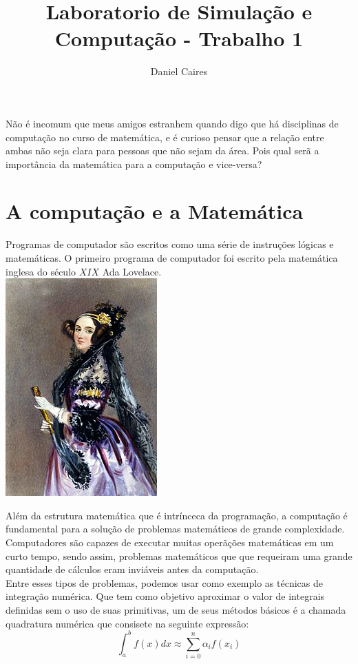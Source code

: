 \documentclass[a4paper,12pt]{article}
\title{Laboratorio de Simulação e Computação - Trabalho 1}
\author{Daniel Caires}
\date{}
\begin{document}
\maketitle

	Não é incomum que meus amigos estranhem quando digo que há disciplinas de computação no curso de matemática, e é curioso pensar que a relação entre ambas não seja clara para pessoas que não sejam da área. Pois qual serã a importância da matemática para a computação e vice-versa?

	\section{A computação e a Matemática}
		Programas de computador são escritos como uma série de instruções lógicas e matemáticas. O primeiro programa de computador foi escrito pela matemática inglesa do século $XIX$ Ada Lovelace.\\
		\includegraphics[scale=0.5]{ada.jpg}

		Além da estrutura matemática que é intrínceca da programação, a computação é fundamental para a solução de problemas matemáticos de grande complexidade. Computadores são capazes de executar muitas operãções matemáticas em um curto tempo, sendo assim, problemas matemáticos que que requeiram uma grande quantidade de cálculos eram inviáveis antes da computação.\\

		Entre esses tipos de problemas, podemos usar como exemplo as técnicas de integração numérica. Que tem como objetivo aproximar o valor de integrais definidas sem o uso de suas primitivas, um de seus métodos básicos é a chamada quadratura numérica que consisete na seguinte expressão:
		\begin{equation*}
			\int_a^b f(x)dx \approx \sum_{i=0}^n \alpha_i f(x_i)
		\end{equation*}
\end{document}
